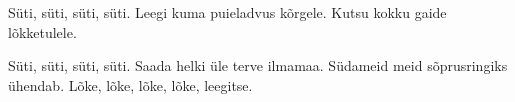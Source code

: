 S\"uti, s\"uti, s\"uti, s\"uti.
Leegi kuma puieladvus k\~orgele.
Kutsu kokku gaide l\~okketulele.

S\"uti, s\"uti, s\"uti, s\"uti.
Saada helki \"ule terve ilmamaa.
S\"udameid meid s\~oprusringiks \"uhendab.
L\~oke, l\~oke, l\~oke, l\~oke, leegitse.